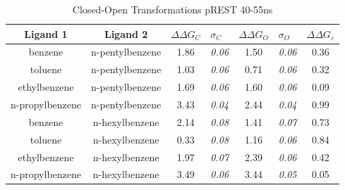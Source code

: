 \documentclass[T4paper.tex]{subfiles}
\begin{document}
\begin{table}[!htb]
\centering
\caption{Closed-Open Transformations pREST 40-55ns}
\label{tbl:C-O_pREST-40-55ns}
\begin{tabular}{|c|c|c|l|c|l|c|}
\hline
\textbf{Ligand 1}       & \textbf{Ligand 2}    & {\color[HTML]{800080} \boldmath$\Delta\Delta G_{C}$} & {\color[HTML]{800080} \boldmath$\sigma_{C}$} & {\color[HTML]{008000} \boldmath$\Delta\Delta G_{O}$} & {\color[HTML]{008000} \boldmath$\sigma_{O}$} & \boldmath$\Delta\Delta G_{\varepsilon}$ \\ \hline
benzene         & n-pentylbenzene & 1.86                                   & \textit{0.06}                       & 1.50                                & \textit{0.06}                       & \cellcolor[HTML]{9AFF99}0.36 \\ \hline
toluene         & n-pentylbenzene & 1.03                                   & \textit{0.06}                       & 0.71                                 & \textit{0.06}                       & \cellcolor[HTML]{9AFF99}0.32 \\ \hline
ethylbenzene    & n-pentylbenzene & 1.69                                   & \textit{0.06}                       & 1.60                                 & \textit{0.06}                       & \cellcolor[HTML]{9AFF99}0.09 \\ \hline
n-propylbenzene & n-pentylbenzene & 3.43                                   & \textit{0.04}                       & 2.44                                & \textit{0.04}                       & \cellcolor[HTML]{9AFF99}0.99 \\ \hline
benzene         & n-hexylbenzene  & 2.14                                   & \textit{0.08}                       & 1.41                                & \textit{0.07}                       & \cellcolor[HTML]{9AFF99}0.73 \\ \hline
toluene         & n-hexylbenzene  & 0.33                                   & \textit{0.08}                       & 1.16                                & \textit{0.06}                       & \cellcolor[HTML]{9AFF99}0.84 \\ \hline
ethylbenzene    & n-hexylbenzene  & 1.97                                   & \textit{0.07}                       & 2.39                                & \textit{0.06}                       & \cellcolor[HTML]{9AFF99}0.42 \\ \hline
n-propylbenzene & n-hexylbenzene  & 3.49                                   & \textit{0.06}                       & 3.44                                 & \textit{0.05}                       & \cellcolor[HTML]{9AFF99}0.05 \\ \hline
\end{tabular}

\end{table}
\end{document}
